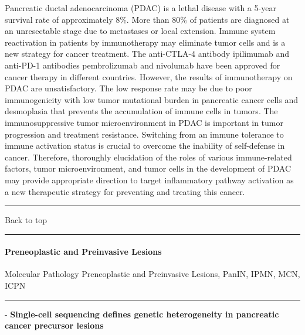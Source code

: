 \documentclass[]{article}
\let\oldparagraph\paragraph
\renewcommand{\paragraph}[1]{\oldparagraph{#1}\mbox{}}
\begin{document}
Pancreatic ductal adenocarcinoma (PDAC) is a lethal disease with a
5-year survival rate of approximately 8\%. More than 80\% of patients
are diagnosed at an unresectable stage due to metastases or local
extension. Immune system reactivation in patients by immunotherapy may
eliminate tumor cells and is a new strategy for cancer treatment. The
anti-CTLA-4 antibody ipilimumab and anti-PD-1 antibodies pembrolizumab
and nivolumab have been approved for cancer therapy in different
countries. However, the results of immunotherapy on PDAC are
unsatisfactory. The low response rate may be due to poor immunogenicity
with low tumor mutational burden in pancreatic cancer cells and
desmoplasia that prevents the accumulation of immune cells in tumors.
The immunosuppressive tumor microenvironment in PDAC is important in
tumor progression and treatment resistance. Switching from an immune
tolerance to immune activation status is crucial to overcome the
inability of self-defense in cancer. Therefore, thoroughly elucidation
of the roles of various immune-related factors, tumor microenvironment,
and tumor cells in the development of PDAC may provide appropriate
direction to target inflammatory pathway activation as a new therapeutic
strategy for preventing and treating this cancer.

{}

{}

\begin{center}\rule{0.5\linewidth}{\linethickness}\end{center}

Back to top

\begin{center}\rule{0.5\linewidth}{\linethickness}\end{center}

\pagebreak

\hypertarget{preneoplastic-and-preinvasive-lesions-1}{%
\paragraph{Preneoplastic and Preinvasive
Lesions}\label{preneoplastic-and-preinvasive-lesions-1}}

Molecular Pathology Preneoplastic and Preinvasive Lesions, PanIN, IPMN,
MCN, ICPN

\begin{center}\rule{0.5\linewidth}{\linethickness}\end{center}

 - \textbf{Single-cell sequencing defines genetic heterogeneity in
pancreatic cancer precursor lesions}
\end{document}

